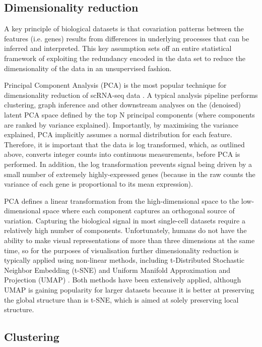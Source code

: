 \subsection{Dimensionality reduction}

A key principle of biological datasets is that covariation patterns between the features (i.e. genes) results from differences in underlying processes that can be inferred and interpreted. This key assumption sets off an entire statistical framework of exploiting the redundancy encoded in the data set to reduce the dimensionality of the data in an unsupervised fashion.

Principal Component Analysis (PCA) is the most popular technique for dimensionality reduction of scRNA-seq data \cite{Luecken2019}. A typical analysis pipeline performs clustering, graph inference and other downstream analyses on the (denoised) latent PCA space defined by the top N principal components (where components are ranked by variance explained). Importantly, by maximising the variance explained, PCA implicitly assumes a normal distribution for each feature. Therefore, it is important that the data is log transformed, which, as outlined above, converts integer counts into continuous measurements, before PCA is performed. In addition, the log transformation prevents signal being driven by a small number of extremely highly-expressed genes (because in the raw counts the variance of each gene is proportional to its mean expression). 

PCA defines a linear transformation from the high-dimensional space to the low-dimensional space where each component captures an orthogonal source of variation. Capturing the biological signal in most single-cell datasets require a relatively high number of components. Unfortunately, humans do not have the ability to make visual representations of more than three dimensions at the same time, so for the purposes of visualisation further dimensionality reduction is typically applied using non-linear methods, including t-Distributed Stochastic Neighbor Embedding (t-SNE) \cite{vanDerMaaten2008} and Uniform Manifold Approximation and Projection (UMAP) \cite{McInnes2018}. Both methods have been extensively applied, although UMAP is gaining popularity for larger datasets because it is better at preserving the global structure than is t-SNE, which is aimed at solely preserving local structure.

\subsection{Clustering}

